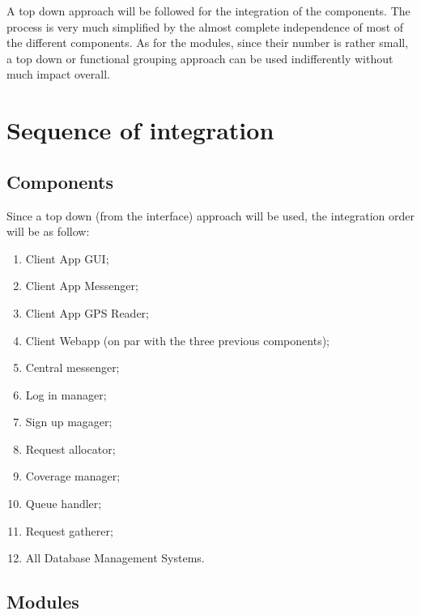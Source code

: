 A top down approach will be followed for the integration of the components. The process is very much simplified by the almost complete independence of most of the different components. As for the modules, since their number is rather small, a top down or functional grouping approach can be used indifferently without much impact overall.


\section{Sequence of integration}

\subsection{Components}
Since a top down (from the interface) approach will be used, the integration order will be as follow:
\begin{enumerate}
\item Client App GUI;
\item Client App Messenger;
\item Client App GPS Reader;
\item Client Webapp (on par with the three previous components);
\item Central messenger;
\item Log in manager;
\item Sign up magager;
\item Request allocator;
\item Coverage manager;
\item Queue handler;
\item Request gatherer;
\item All Database Management Systems.
\end{enumerate}

\subsection{Modules}